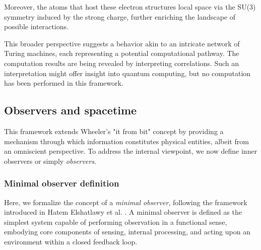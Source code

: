 \documentclass{ijuc}
\begin{document}
Moreover, the atoms that host these electron structures local space via the SU(3) symmetry induced by the strong charge, further enriching the landscape of possible interactions.

This broader perspective suggests a behavior akin to an intricate network of Turing machines, each representing a potential computational pathway. 
The computation results are being revealed by interpreting correlations. 
Such an interpretation might offer insight into quantum computing, but no computation has been performed in this framework.

\subsection{Observers and spacetime}\label{subsec:observers}  

This framework extends Wheeler's "it from bit" concept by providing a mechanism through which information constitutes physical entities, albeit from an omniscient perspective. 
To address the internal viewpoint, we now define inner observers or simply \textit{observers}. 

\subsubsection{Minimal observer definition}

Here, we formalize the concept of a \emph{minimal observer}, following the framework introduced in Hatem Elshatlawy et al. \cite{elshatlawy2025towards}. 
A minimal observer is defined as the simplest system capable of performing observation in a functional sense, embodying core components of sensing, internal processing, and acting upon an environment within a closed feedback loop.
\end{document}
